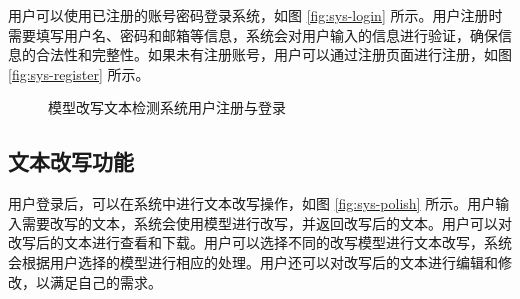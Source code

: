 用户可以使用已注册的账号密码登录系统，如图 \ref{fig:sys-login} 所示。用户注册时需要填写用户名、密码和邮箱等信息，系统会对用户输入的信息进行验证，确保信息的合法性和完整性。如果未有注册账号，用户可以通过注册页面进行注册，如图 \ref{fig:sys-register} 所示。

\begin{figure}[htb]
    \hfill
    \caption{模型改写文本检测系统用户注册与登录}
    \label{fig:sys-login-register}
\end{figure}

\subsection{文本改写功能}

用户登录后，可以在系统中进行文本改写操作，如图 \ref{fig:sys-polish} 所示。用户输入需要改写的文本，系统会使用模型进行改写，并返回改写后的文本。用户可以对改写后的文本进行查看和下载。用户可以选择不同的改写模型进行文本改写，系统会根据用户选择的模型进行相应的处理。用户还可以对改写后的文本进行编辑和修改，以满足自己的需求。

